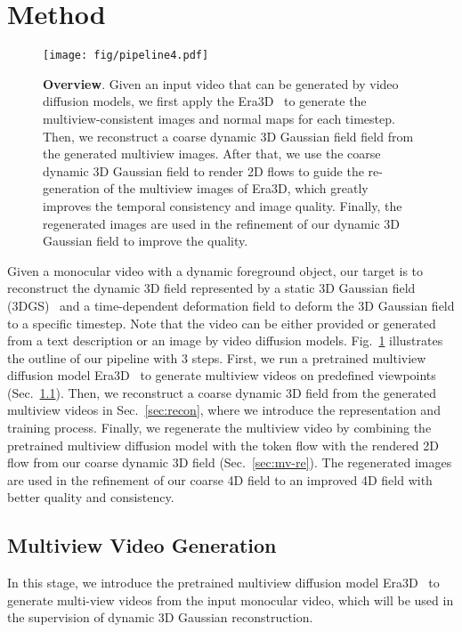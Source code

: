 \section{Method}

\begin{figure}
    \centering
    \texttt{[image: fig/pipeline4.pdf]}
    \caption{\textbf{Overview}. Given an input video that can be generated by video diffusion models, we first apply the Era3D~\cite{li2024era3d} to generate the multiview-consistent images and normal maps for each timestep. Then, we reconstruct a coarse dynamic 3D Gaussian field field from the generated multiview images. After that, we use the coarse dynamic 3D Gaussian field to render 2D flows to guide the re-generation of the multiview images of Era3D, which greatly improves the temporal consistency and image quality. Finally, the regenerated images are used in the refinement of our dynamic 3D Gaussian field to improve the quality.}
    \label{fig:overview}
\end{figure}

Given a monocular video with a dynamic foreground object, our target is to reconstruct the dynamic 3D field represented by a static 3D Gaussian field (3DGS)~\citep{kerbl20233dgs} and a time-dependent deformation field to deform the 3D Gaussian field to a specific timestep. Note that the video can be either provided or generated from a text description or an image by video diffusion models.
Fig.~\ref{fig:overview} illustrates the outline of our pipeline with 3 steps.
First, we run a pretrained multiview diffusion model Era3D~\citep{li2024era3d} to generate multiview videos on predefined viewpoints (Sec.~\ref{sec:mv-init}). 
Then, we reconstruct a coarse dynamic 3D field from the generated multiview videos in Sec.~\ref{sec:recon}, where we introduce the representation and training process.
Finally, we regenerate the multiview video by combining the pretrained multiview diffusion model with the token flow with the rendered 2D flow from our coarse dynamic 3D field (Sec.~\ref{sec:mv-re}). The regenerated images are used in the refinement of our coarse 4D field to an improved 4D field with better quality and consistency.


\subsection{Multiview Video Generation}
\label{sec:mv-init}

In this stage, we introduce the pretrained multiview diffusion model Era3D~\citep{li2024era3d} to generate multi-view videos from the input monocular video, which will be used in the supervision of dynamic 3D Gaussian reconstruction. 

